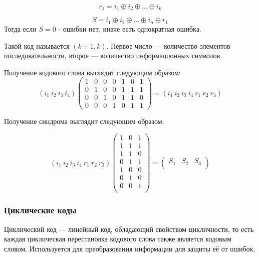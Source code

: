 \begin{equation}
    r_1 = i_1 \oplus i_2 \oplus ... \oplus i_k
\end{equation}

\begin{equation}
    S = i_1 \oplus i_2 \oplus ... \oplus i_n \oplus r_1
\end{equation}
Тогда если $S = 0$ - ошибки нет, иначе есть однократная ошибка.

Такой код называется $(k+1,k)$. Первое число — количество элементов последовательности, второе — количество информационных символов.

Получение кодового слова выглядит следующим образом:
\begin{equation}
( i_1 \> i_2 \> i_3 \> i_4 )  \begin{pmatrix}
1 & 0 & 0 & 0 & 1 & 0 & 1 \\
0 & 1 & 0 & 0 & 1 & 1 & 1 \\         
0 & 0 & 1 & 0 & 1 & 1 & 0 \\
0 & 0 & 0 & 1 & 0 & 1 & 1
\end{pmatrix} = ( i_1 \> i_2 \> i_3 \> i_4  \> r_1  \> r_2  \> r_3)
\end{equation}

Получение синдрома выглядит следующим образом:

\begin{equation}
(i_{1} \> i_{2} \> i_{3} \> i_{4} \> r_{1} \> r_{2} \> r_{3} )  \begin{pmatrix}
1 & 0 & 1 \\
1 & 1 & 1 \\
1 & 1 & 0 \\
0 & 1 & 1 \\
1 & 0 & 0 \\
0 & 1 & 0 \\
0 & 0 & 1 \\ 
\end{pmatrix} = \begin{pmatrix}S_{1}&S_{2}&S_{3}\\\end{pmatrix}
\end{equation}

\subsubsection{Циклические коды}
Циклический код — линейный код, обладающий свойством цикличности, то есть каждая циклическая перестановка кодового слова также является кодовым словом. Используется для преобразования информации для защиты её от ошибок.

